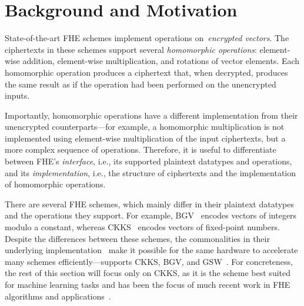\section{Background and Motivation}\label{sec:background}

\figBreakdown

State-of-the-art %
FHE schemes implement operations on~\emph{encrypted vectors}.
The ciphertexts in these schemes support several \emph{homomorphic operations}:
element-wise addition, element-wise multiplication,
and rotations of vector elements.
Each homomorphic operation produces a ciphertext that, when decrypted,
produces the same result as if the operation had been performed on the unencrypted inputs.

Importantly, homomorphic operations have a different implementation from their unencrypted counterparts---for example,
a homomorphic multiplication is not implemented using element-wise multiplication
of the input ciphertexts, but a more complex
sequence of operations. Therefore, it is useful to differentiate between FHE's \emph{interface},
i.e., its supported plaintext datatypes and operations,
and its \emph{implementation},
i.e., the structure of ciphertexts and the implementation of homomorphic operations.

There are several FHE schemes, which mainly differ in their plaintext datatypes and the operations they support.
For example, BGV~\cite{brakerski:toct14:leveled} encodes vectors of integers modulo a constant,
whereas CKKS~\cite{cheon:ictaci17:homomorphic} encodes vectors of fixed-point numbers.
Despite the differences between these schemes, %
the commonalities in their underlying implementation~\cite{lyubashevsky:tact10:ideal}
make it possible for the same hardware to
accelerate many schemes
efficiently---\name supports CKKS, BGV, and GSW~\cite{gentry:crypto13:homomorphic}.
For concreteness, the rest of this section will focus only on CKKS, as it
is the scheme best suited for machine learning tasks and has been the focus of
much recent work in FHE algorithms and applications~\cite{han:iacr18:efficient,lee:2021:privacy,gilad:icml16:cryptonets,podschwadt:2020:classification,dathathri:pldi19:chet,dathathri:pldi20:eva,bossuat:eurocrypt21:efficient}.


